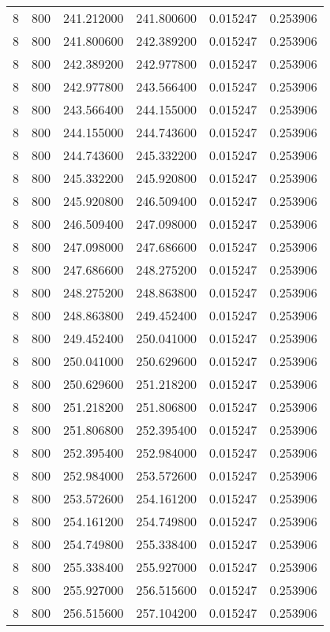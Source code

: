 \begin{longtable}{rrrrrr}
8 & 800 & 241.212000 & 241.800600 & 0.015247 & 0.253906 \\
8 & 800 & 241.800600 & 242.389200 & 0.015247 & 0.253906 \\
8 & 800 & 242.389200 & 242.977800 & 0.015247 & 0.253906 \\
8 & 800 & 242.977800 & 243.566400 & 0.015247 & 0.253906 \\
8 & 800 & 243.566400 & 244.155000 & 0.015247 & 0.253906 \\
8 & 800 & 244.155000 & 244.743600 & 0.015247 & 0.253906 \\
8 & 800 & 244.743600 & 245.332200 & 0.015247 & 0.253906 \\
8 & 800 & 245.332200 & 245.920800 & 0.015247 & 0.253906 \\
8 & 800 & 245.920800 & 246.509400 & 0.015247 & 0.253906 \\
8 & 800 & 246.509400 & 247.098000 & 0.015247 & 0.253906 \\
8 & 800 & 247.098000 & 247.686600 & 0.015247 & 0.253906 \\
8 & 800 & 247.686600 & 248.275200 & 0.015247 & 0.253906 \\
8 & 800 & 248.275200 & 248.863800 & 0.015247 & 0.253906 \\
8 & 800 & 248.863800 & 249.452400 & 0.015247 & 0.253906 \\
8 & 800 & 249.452400 & 250.041000 & 0.015247 & 0.253906 \\
8 & 800 & 250.041000 & 250.629600 & 0.015247 & 0.253906 \\
8 & 800 & 250.629600 & 251.218200 & 0.015247 & 0.253906 \\
8 & 800 & 251.218200 & 251.806800 & 0.015247 & 0.253906 \\
8 & 800 & 251.806800 & 252.395400 & 0.015247 & 0.253906 \\
8 & 800 & 252.395400 & 252.984000 & 0.015247 & 0.253906 \\
8 & 800 & 252.984000 & 253.572600 & 0.015247 & 0.253906 \\
8 & 800 & 253.572600 & 254.161200 & 0.015247 & 0.253906 \\
8 & 800 & 254.161200 & 254.749800 & 0.015247 & 0.253906 \\
8 & 800 & 254.749800 & 255.338400 & 0.015247 & 0.253906 \\
8 & 800 & 255.338400 & 255.927000 & 0.015247 & 0.253906 \\
8 & 800 & 255.927000 & 256.515600 & 0.015247 & 0.253906 \\
8 & 800 & 256.515600 & 257.104200 & 0.015247 & 0.253906 \\

\end{longtable}
